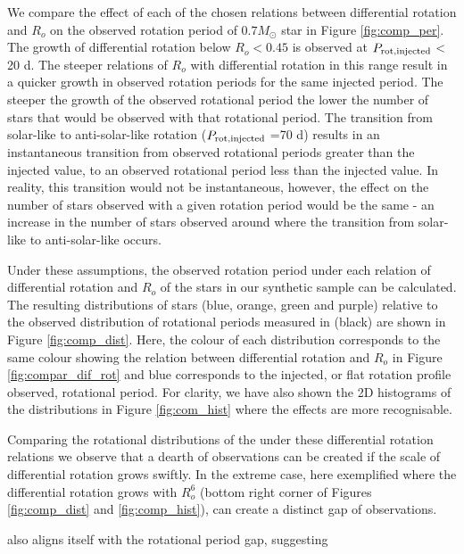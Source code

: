 We compare the effect of each of the chosen relations between differential rotation and $R_o$ on the observed rotation period of $0.7 M_{\odot}$ star in Figure \ref{fig:comp_per}.
The growth of differential rotation below $R_o<0.45$ is observed at $P_{\rm{rot, injected}}$ < 20 d.
The steeper relations of $R_o$ with differential rotation in this range result in a quicker growth in observed rotation periods for the same injected period.
The steeper the growth of the observed rotational period the lower the number of stars that would be observed with that rotational period.
The transition from solar-like to anti-solar-like rotation ($P_{\rm{rot, injected}}$ =70 d) results in an instantaneous transition from observed rotational periods greater than the injected value, to an observed rotational period less than the injected value.
In reality, this transition would not be instantaneous, however, the effect on the number of stars observed with a given rotation period would be the same - an increase in the number of stars observed around where the transition from solar-like to anti-solar-like occurs.

Under these assumptions, the observed rotation period under each relation of differential rotation and $R_o$ of the stars in our synthetic sample can be calculated.
The resulting distributions of stars (blue, orange, green and purple) relative to the observed distribution of \kepler{} rotational periods measured in \citet{mcquillan_rotational_2014} (black) are shown in Figure \ref{fig:comp_dist}.
Here, the colour of each distribution corresponds to the same colour showing the relation between differential rotation and $R_o$ in Figure \ref{fig:compar_dif_rot} and blue corresponds to the injected, or flat rotation profile observed, rotational period.
For clarity, we have also shown the 2D histograms of the distributions in Figure \ref{fig:com_hist} where the effects are more recognisable.

Comparing the rotational distributions of the under these differential rotation relations we observe that a dearth of observations can be created if the scale of differential rotation grows swiftly.
In the extreme case, here exemplified where the differential rotation grows with $R_o^6$ (bottom right corner of Figures \ref{fig:comp_dist} and  \ref{fig:comp_hist}), can create a distinct gap of observations.


 also aligns itself with the rotational period gap, suggesting 


